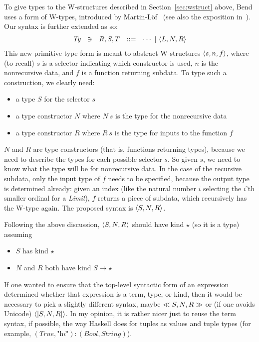\documentclass{article}
\begin{document}
To give types to the W-structures described in
Section~\ref{sec:wstruct} above, Bend uses a form of W-types,
introduced by Martin-L\"of~\cite{Mar84} (see also the exposition
in~\cite{mlttprog}).  Our syntax is further extended as so:
\[
\begin{array}{lllll}
  \textit{Ty} & \ni & R,S,T & ::= & \cdots\ |\ \w{L}{N}{R} 
\end{array}
\]
\noindent This new primitive type form is meant to abstract
W-structures $\langle s , n, f \rangle$, where (to recall) $s$ is a selector
indicating which constructor is used, $n$ is the nonrecursive data,
and $f$ is a function returning subdata.  To type such a construction,
we clearly need:
\begin{itemize}
\item a type $S$ for the selector $s$
\item a type constructor $N$ where $N\ s$ is the type for the nonrecursive data
\item a type constructor $R$ where $R\ s$ is the type for inputs to the function $f$
\end{itemize}
\noindent $N$ and $R$ are type constructors (that is, functions returning types), because
we need to describe the types for each possible selector $s$.  So given $s$, we need
to know what the type will be for nonrecursive data.
In the case of the recursive subdata, only the input type of $f$ needs to be specified, because the output
type is determined already: given an index (like the natural number $i$ selecting the $i$'th smaller
ordinal for a \textit{Limit}), $f$ returns a piece of subdata, which recursively
has the W-type again.  The proposed syntax is $\langle S , N , R \rangle$.

Following the above discussion, $\langle S , N , R \rangle$ should have kind $\star$
(so it is a type) assuming
\begin{itemize}
\item $S$ has kind $\star$
\item $N$ and $R$ both have kind $S \to \star$
\end{itemize}

\noindent If one wanted to ensure that the top-level syntactic form of an expression
determined whether that expression is a term, type, or kind, then it would be necessary
to pick a slightly different syntax, maybe $\ll S , N , R \gg$ or (if one avoids Unicode) $\langle| S , N , R |\rangle$.
In my opinion, it is rather nicer just to reuse the term syntax, if possible, the way
Haskell does for tuples as values and tuple types (for example, $(\textit{True},\textit{"hi"}) : (\textit{Bool},\textit{String})$).
\end{document}
